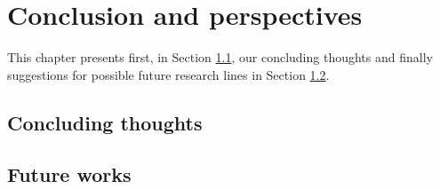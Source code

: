 \chapter{Conclusion and perspectives}
\label{chap:concl}
 
 
This chapter presents first, in Section \ref{sec:concl}, our concluding thoughts and 
finally suggestions for possible future research lines in Section \ref{sec:future}.



\section{Concluding thoughts}
\label{sec:concl}

\lipsum[2]



\section{Future works}
\label{sec:future}

\lipsum[2]
